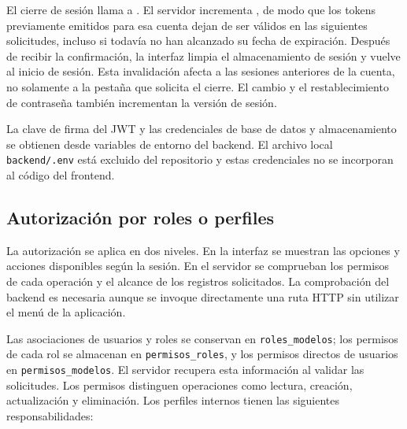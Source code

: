 El cierre de sesión llama a . El servidor incrementa
, de modo que los tokens previamente emitidos para
esa cuenta dejan de ser válidos en las siguientes solicitudes, incluso
si todavía no han alcanzado su fecha de expiración. Después de recibir la
confirmación, la interfaz limpia el almacenamiento de sesión y vuelve al
inicio de sesión. Esta invalidación afecta a las sesiones anteriores de
la cuenta, no solamente a la pestaña que solicita el cierre. El cambio y
el restablecimiento de contraseña también incrementan la versión de sesión.

La clave de firma del JWT y las credenciales de base de datos y almacenamiento
se obtienen desde variables de entorno del backend. El archivo local
\texttt{backend/.env} está excluido del repositorio y estas credenciales
no se incorporan al código del frontend.

\subsection{Autorización por roles o perfiles}

La autorización se aplica en dos niveles. En la interfaz se muestran las
opciones y acciones disponibles según la sesión. En el servidor se
comprueban los permisos de cada operación y el alcance de los registros
solicitados. La comprobación del backend es necesaria aunque se invoque
directamente una ruta HTTP sin utilizar el menú de la aplicación.

Las asociaciones de usuarios y roles se conservan en
\texttt{roles\_modelos}; los permisos de cada rol se almacenan en
\texttt{permisos\_roles}, y los permisos directos de usuarios en
\texttt{permisos\_modelos}. El servidor recupera esta información al
validar las solicitudes. Los permisos distinguen operaciones como lectura,
creación, actualización y eliminación. Los perfiles internos tienen las
siguientes responsabilidades:

